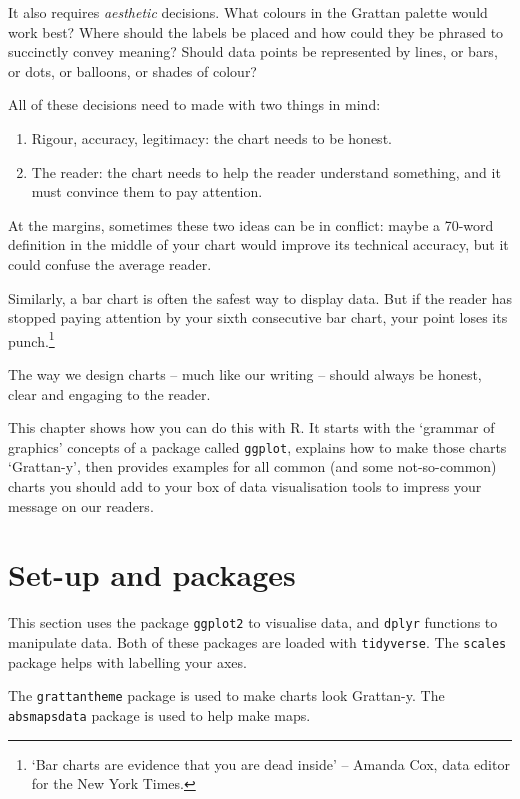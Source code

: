 \documentclass[]{book}
\providecommand{\tightlist}{%
  \setlength{\itemsep}{0pt}\setlength{\parskip}{0pt}}
\let\rmarkdownfootnote\footnote%
\def\footnote{\protect\rmarkdownfootnote}
\begin{document}
It also requires \emph{aesthetic} decisions. What colours in the Grattan palette would work best? Where should the labels be placed and how could they be phrased to succinctly convey meaning? Should data points be represented by lines, or bars, or dots, or balloons, or shades of colour?

All of these decisions need to made with two things in mind:

\begin{enumerate}
\def\labelenumi{\arabic{enumi}.}
\tightlist
\item
  Rigour, accuracy, legitimacy: the chart needs to be honest.
\item
  The reader: the chart needs to help the reader understand something, and it must convince them to pay attention.
\end{enumerate}

At the margins, sometimes these two ideas can be in conflict: maybe a 70-word definition in the middle of your chart would improve its technical accuracy, but it could confuse the average reader.

Similarly, a bar chart is often the safest way to display data. But if the reader has stopped paying attention by your sixth consecutive bar chart, your point loses its punch.\footnote{`Bar charts are evidence that you are dead inside' -- Amanda Cox, data editor for the New York Times.}

The way we design charts -- much like our writing -- should always be honest, clear and engaging to the reader.

This chapter shows how you can do this with R. It starts with the `grammar of graphics' concepts of a package called \texttt{ggplot}, explains how to make those charts `Grattan-y', then provides examples for all common (and some not-so-common) charts you should add to your box of data visualisation tools to impress your message on our readers.

\hypertarget{set-up-and-packages}{%
\section{Set-up and packages}\label{set-up-and-packages}}

This section uses the package \texttt{ggplot2} to visualise data, and \texttt{dplyr} functions to manipulate data. Both of these packages are loaded with \texttt{tidyverse}. The \texttt{scales} package helps with labelling your axes.

The \texttt{grattantheme} package is used to make charts look Grattan-y. The \texttt{absmapsdata} package is used to help make maps.
\end{document}
